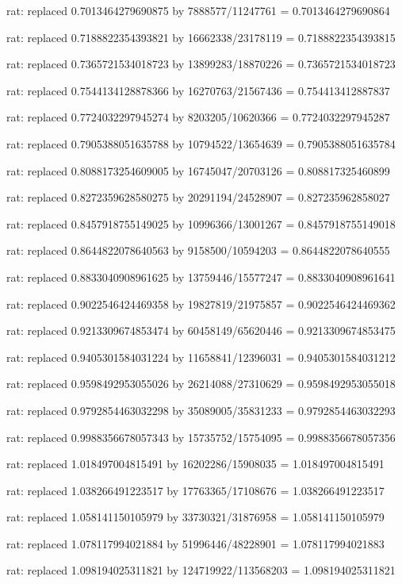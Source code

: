 \documentclass[a4paper,10pt]{article}
\begin{document}
\begin{eulernotebook}
\begin{eulercomment}
\begin{eulercomment}
\begin{eulercomment}
\begin{eulercomment}
\begin{eulercomment}
\begin{eulercomment}
\begin{eulercomment}
\begin{eulercomment}
\begin{eulercomment}
\begin{eulercomment}
\begin{eulercomment}
\begin{eulercomment}
\begin{eulercomment}
\begin{eulercomment}
\begin{eulercomment}
\begin{eulercomment}
\begin{euleroutput}
  rat: replaced 0.7013464279690875 by 7888577/11247761 = 0.7013464279690864
  
  rat: replaced 0.7188822354393821 by 16662338/23178119 = 0.7188822354393815
  
  rat: replaced 0.7365721534018723 by 13899283/18870226 = 0.7365721534018723
  
  rat: replaced 0.7544134128878366 by 16270763/21567436 = 0.754413412887837
  
  rat: replaced 0.7724032297945274 by 8203205/10620366 = 0.7724032297945287
  
  rat: replaced 0.7905388051635788 by 10794522/13654639 = 0.7905388051635784
  
  rat: replaced 0.8088173254609005 by 16745047/20703126 = 0.808817325460899
  
  rat: replaced 0.8272359628580275 by 20291194/24528907 = 0.827235962858027
  
  rat: replaced 0.8457918755149025 by 10996366/13001267 = 0.8457918755149018
  
  rat: replaced 0.8644822078640563 by 9158500/10594203 = 0.8644822078640555
  
  rat: replaced 0.8833040908961625 by 13759446/15577247 = 0.8833040908961641
  
  rat: replaced 0.9022546424469358 by 19827819/21975857 = 0.9022546424469362
  
  rat: replaced 0.9213309674853474 by 60458149/65620446 = 0.9213309674853475
  
  rat: replaced 0.9405301584031224 by 11658841/12396031 = 0.9405301584031212
  
  rat: replaced 0.9598492953055026 by 26214088/27310629 = 0.9598492953055018
  
  rat: replaced 0.9792854463032298 by 35089005/35831233 = 0.9792854463032293
  
  rat: replaced 0.9988356678057343 by 15735752/15754095 = 0.9988356678057356
  
  rat: replaced 1.018497004815491 by 16202286/15908035 = 1.018497004815491
  
  rat: replaced 1.038266491223517 by 17763365/17108676 = 1.038266491223517
  
  rat: replaced 1.058141150105979 by 33730321/31876958 = 1.058141150105979
  
  rat: replaced 1.078117994021884 by 51996446/48228901 = 1.078117994021883
  
  rat: replaced 1.098194025311821 by 124719922/113568203 = 1.098194025311821
  

\end{euleroutput}
\end{eulercomment}
\end{eulercomment}
\end{eulercomment}
\end{eulercomment}
\end{eulercomment}
\end{eulercomment}
\end{eulercomment}
\end{eulercomment}
\end{eulercomment}
\end{eulercomment}
\end{eulercomment}
\end{eulercomment}
\end{eulercomment}
\end{eulercomment}
\end{eulercomment}
\end{eulercomment}
\end{eulernotebook}
\end{document}
